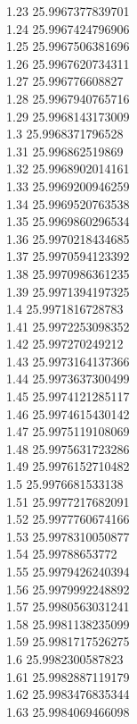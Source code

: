 {1.23	25.9967377839701\\
1.24	25.9967424796906\\
1.25	25.9967506381696\\
1.26	25.9967620734311\\
1.27	25.996776608827\\
1.28	25.9967940765716\\
1.29	25.9968143173009\\
1.3	25.9968371796528\\
1.31	25.996862519869\\
1.32	25.9968902014161\\
1.33	25.9969200946259\\
1.34	25.9969520763538\\
1.35	25.9969860296534\\
1.36	25.9970218434685\\
1.37	25.9970594123392\\
1.38	25.9970986361235\\
1.39	25.9971394197325\\
1.4	25.9971816728783\\
1.41	25.9972253098352\\
1.42	25.997270249212\\
1.43	25.9973164137366\\
1.44	25.9973637300499\\
1.45	25.9974121285117\\
1.46	25.9974615430142\\
1.47	25.9975119108069\\
1.48	25.9975631723286\\
1.49	25.9976152710482\\
1.5	25.9976681533138\\
1.51	25.9977217682091\\
1.52	25.9977760674166\\
1.53	25.9978310050877\\
1.54	25.99788653772\\
1.55	25.9979426240394\\
1.56	25.9979992248892\\
1.57	25.9980563031241\\
1.58	25.9981138235099\\
1.59	25.9981717526275\\
1.6	25.9982300587823\\
1.61	25.9982887119179\\
1.62	25.9983476835344\\
1.63	25.9984069466098\\
}
